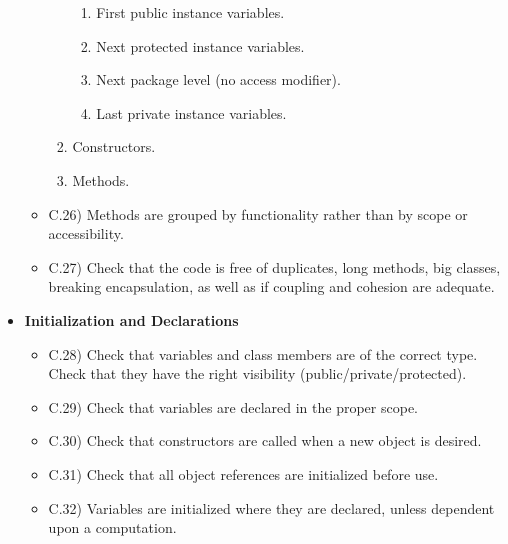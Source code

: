 \documentclass[../../codeInspection.tex]{subfiles}
\begin{document}
\begin{itemize}
\begin{itemize}
\begin{enumerate}
										\begin{enumerate}

											\item First public instance variables.

											\item Next protected instance variables.

											\item Next package level (no access modifier).

											\item Last private instance variables.

										\end{enumerate}

									\item Constructors.

									\item Methods.

								\end{enumerate}

							\item C.26)\label{C:26} Methods are grouped by functionality rather than by scope or accessibility.

							\item C.27)\label{C:27} Check that the code is free of duplicates, long methods, big classes, breaking encapsulation, as well as if coupling and cohesion are adequate.

						\end{itemize}

				\item 	\textbf{Initialization and Declarations}
						\begin{itemize}

							\item C.28)\label{C:28} Check that variables and class members are of the correct type. Check that they have the right visibility (public/private/protected).

							\item C.29)\label{C:29} Check that variables are declared in the proper scope.

							\item C.30)\label{C:30} Check that constructors are called when a new object is desired.

							\item C.31)\label{C:31} Check that all object references are initialized before use.

							\item C.32)\label{C:32} Variables are initialized where they are declared, unless dependent upon a computation.


\end{itemize}
\end{itemize}
\end{document}
